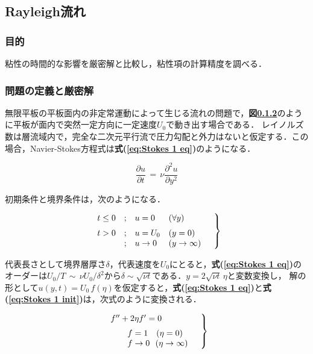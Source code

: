 \graphicspath{{./fig_Rayleigh/}}

\subsection{Rayleigh流れ}

%
\subsubsection{目的}
粘性の時間的な影響を厳密解と比較し，粘性項の計算精度を調べる．

%
\subsubsection{問題の定義と厳密解}

無限平板の平板面内の非定常運動によって生じる流れの問題で，\textbf{図\ref{}}のように平板が面内で突然一定方向に一定速度$U_0$で動き出す場合である\cite{hino:74:fd}．
レイノルズ数は層流域内で，完全な二次元平行流で圧力勾配と外力はないと仮定する．この場合，Navier-Stokes方程式は\textbf{式(\ref{eq:Stokes 1 eq})}のようになる．

\begin{equation}
\frac{\partial u}{\partial t}
\,=\,
\nu \frac{\partial^2 u}{\partial y^2}
\label{eq:Stokes 1 eq}
\end{equation}

\vspace{3mm}
初期条件と境界条件は，次のようになる．

\begin{equation}
\left .
\begin{array}{llll}
\vspace{2mm}
t \le 0 & ; & u=0 & ( \forall y )\\
t > 0 & ; & u=U_0 & (y=0)\\
& ; & u \rightarrow 0 & (y \rightarrow \infty)\\
\end{array} \quad \right \}
\label{eq:Stokes 1 init}
\end{equation}

代表長さとして境界層厚さ$\delta$，代表速度を$U_0$にとると，\textbf{式(\ref{eq:Stokes 1 eq})}のオーダーは$U_0 \slash T \,\sim \, \nu U_0 \slash \delta^2$から$\delta \sim \sqrt{\nu t}$である．$y=2\sqrt{\nu t}\,\eta$と変数変換し，
解の形として$u(y,t)=U_0\,f(\eta)$を仮定すると，\textbf{式(\ref{eq:Stokes 1 eq})}と\textbf{式(\ref{eq:Stokes 1 init})}は，次式のように変換される．

\begin{equation}
\left.
\begin{array}{l}
\vspace{2mm}
f^{\prime \prime} + 2 \eta f^{\prime}=0 \\
\qquad f=1\quad(\eta=0)\\
\qquad f \rightarrow 0\,\,\,\,(\eta \rightarrow \infty)\\
\end{array}
\quad \right\}
\label{eq:Stokes 1 : trans}
\end{equation}

